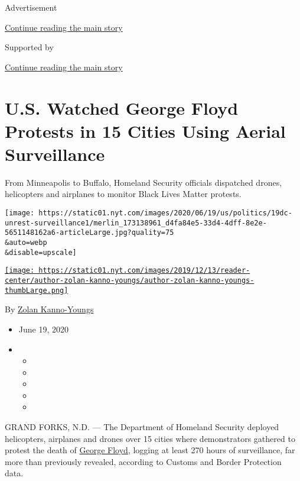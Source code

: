 Advertisement

\protect\hyperlink{after-top}{Continue reading the main story}

Supported by

\protect\hyperlink{after-sponsor}{Continue reading the main story}

\hypertarget{us-watched-george-floyd-protests-in-15-cities-using-aerial-surveillance}{%
\section{U.S. Watched George Floyd Protests in 15 Cities Using Aerial
Surveillance}\label{us-watched-george-floyd-protests-in-15-cities-using-aerial-surveillance}}

From Minneapolis to Buffalo, Homeland Security officials dispatched
drones, helicopters and airplanes to monitor Black Lives Matter
protests.

\texttt{[image: https://static01.nyt.com/images/2020/06/19/us/politics/19dc-unrest-surveillance1/merlin\_173138961\_d4fa84e5-33d4-4dff-8e2e-5651148162a6-articleLarge.jpg?quality=75\\\&auto=webp\\\&disable=upscale]}

\href{https://www.nytimes.com/by/zolan-kanno-youngs}{\texttt{[image: https://static01.nyt.com/images/2019/12/13/reader-center/author-zolan-kanno-youngs/author-zolan-kanno-youngs-thumbLarge.png]}}

By \href{https://www.nytimes.com/by/zolan-kanno-youngs}{Zolan
Kanno-Youngs}

\begin{itemize}
\item
  June 19, 2020
\item
  \begin{itemize}
  \item
  \item
  \item
  \item
  \item
  \end{itemize}
\end{itemize}

GRAND FORKS, N.D. --- The Department of Homeland Security deployed
helicopters, airplanes and drones over 15 cities where demonstrators
gathered to protest the death of
\href{https://www.nytimes.com/2020/07/28/us/umbrella-man-identified-minneapolis.html}{George
Floyd}, logging at least 270 hours of surveillance, far more than
previously revealed, according to Customs and Border Protection data.

